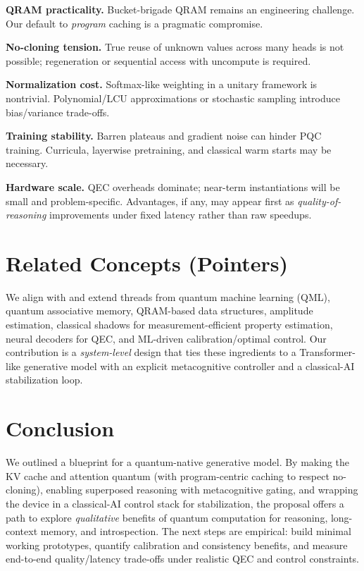 \documentclass[11pt]{article}
\begin{document}
\textbf{QRAM practicality.} Bucket-brigade QRAM remains an engineering challenge.
Our default to \emph{program} caching is a pragmatic compromise.

\textbf{No-cloning tension.} True reuse of unknown values across many heads is not possible; regeneration or sequential access with uncompute is required.

\textbf{Normalization cost.} Softmax-like weighting in a unitary framework is nontrivial.
Polynomial/LCU approximations or stochastic sampling introduce bias/variance trade-offs.

\textbf{Training stability.} Barren plateaus and gradient noise can hinder PQC training.
Curricula, layerwise pretraining, and classical warm starts may be necessary.

\textbf{Hardware scale.} QEC overheads dominate; near-term instantiations will be small and problem-specific.
Advantages, if any, may appear first as \emph{quality-of-reasoning} improvements under fixed latency rather than raw speedups.

\section{Related Concepts (Pointers)}
We align with and extend threads from quantum machine learning (QML), quantum associative memory, QRAM-based data structures, amplitude estimation, classical shadows for measurement-efficient property estimation, neural decoders for QEC, and ML-driven calibration/optimal control.
Our contribution is a \emph{system-level} design that ties these ingredients to a Transformer-like generative model with an explicit metacognitive controller and a classical-AI stabilization loop.

\section{Conclusion}

We outlined a blueprint for a quantum-native generative model.
By making the KV cache and attention quantum (with program-centric caching to respect no-cloning), enabling superposed reasoning with metacognitive gating, and wrapping the device in a classical-AI control stack for stabilization, the proposal offers a path to explore \emph{qualitative} benefits of quantum computation for reasoning, long-context memory, and introspection.
The next steps are empirical: build minimal working prototypes, quantify calibration and consistency benefits, and measure end-to-end quality/latency trade-offs under realistic QEC and control constraints.
\end{document}
